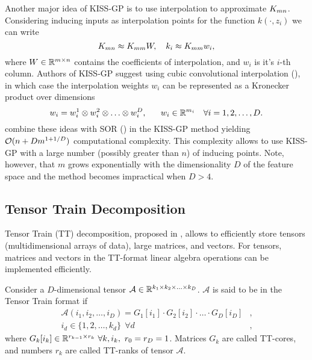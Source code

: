   Another major idea of KISS-GP is to use interpolation to approximate $K_{mn}$.
  Considering inducing inputs as interpolation points for the function
  $k(\cdot, z_i)$ we can write
  \begin{equation}
  \label{kernel_interpolation}
    K_{mn} \approx K_{mm} W,~~~k_{i} \approx K_{mm} w_i,
  \end{equation}
  where $W \in \mathbb{R}^{m \times n}$ contains the coefficients of interpolation, and
  $w_i$ is it's $i$-th column. Authors of KISS-GP suggest using cubic
  convolutional interpolation (\citet{keys1981}), in which case the interpolation
  weights $w_i$ can be represented as a Kronecker product over dimensions
  \[
    w_i = w_i^1 \otimes w_i^2 \otimes \ldots \otimes w_i^D,~~~~~w_i \in \mathbb{R}^{m_i}~~~\forall i = 1, 2, \ldots, D.
  \]
  \citet{wilson2015} combine these ideas with SOR (\citet{silverman1985})
  in the KISS-GP method yielding $\mathcal{O}(n + D m^{1 + 1/D})$ computational
  complexity. This complexity allows to use KISS-GP with a large number (possibly
  greater than $n$) of inducing points. Note, however, that $m$ grows
  exponentially with the dimensionality $D$ of the feature space and the
  method becomes impractical when $D > 4$.

\subsection{Tensor Train Decomposition}
\label{tensor_train}

  Tensor Train (TT) decomposition, proposed in \citet{oseledets2011}, allows to
  efficiently store tensors (multidimensional arrays of data), large matrices, and
  vectors. For tensors, matrices and vectors in the TT-format linear algebra operations
  can be implemented efficiently. 

  Consider a $D$-dimensional tensor $\mathcal A \in \mathbb{R}^{k_1 \times k_2 \times \ldots \times k_D}$.
  $\mathcal{A}$ is said to be in the Tensor Train format if
  \begin{equation}
  \label{tt}
  \begin{split}
    \mathcal{A}(i_1, i_2, \ldots, i_D) =  G_1[i_1] \cdot G_2[i_2] \cdot \ldots \cdot G_D[i_D]&,\\
    i_d \in \{1, 2, \ldots, k_d\}~~\forall d&,
  \end{split}
  \end{equation}
  where $G_k[i_k] \in \mathbb{R}^{r_{k-1}\times r_{k}}\ \forall k, i_k,\ r_0 = r_{D} = 1$. Matrices $G_k$ are called TT-cores, and numbers $r_k$ are called TT-ranks of
  tensor $\mathcal{A}$.

